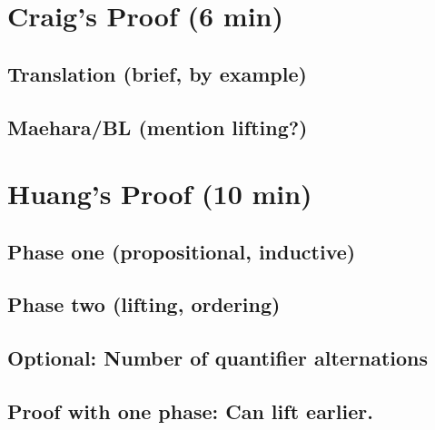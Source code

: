 \documentclass[final,compress]{beamer}
\begin{document}
\section{Craig's Proof (6 min)}

\subsection{Translation (brief, by example)}
\begin{frame}
\end{frame}

\subsection{Maehara/BL (mention lifting?)}
\begin{frame}
\end{frame}


\section{Huang's Proof (10 min)}

\subsection{Phase one (propositional, inductive)}
\begin{frame}
\end{frame}

\subsection{Phase two (lifting, ordering)}
\begin{frame}
\end{frame}

\subsection{Optional: Number of quantifier alternations}
\begin{frame}
\end{frame}


\subsection{Proof with one phase: Can lift earlier.}
\begin{frame}
\end{frame}
\end{document}
